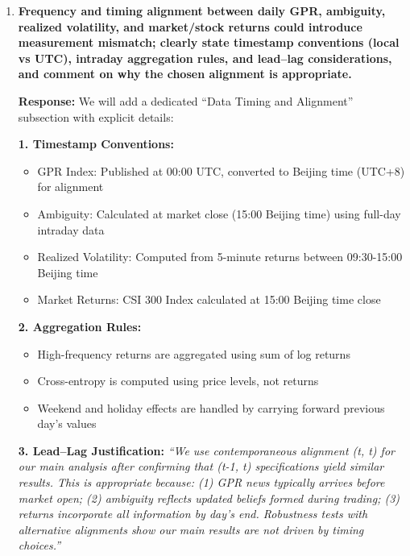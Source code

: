 \documentclass[12pt]{article}
\begin{document}
\begin{enumerate}
    \vspace{0.5cm}

    \item \textbf{Frequency and timing alignment between daily GPR, ambiguity, realized volatility, and market/stock returns could introduce measurement mismatch; clearly state timestamp conventions (local vs UTC), intraday aggregation rules, and lead--lag considerations, and comment on why the chosen alignment is appropriate.}

    \begin{responsebox}
    \textbf{Response:} We will add a dedicated ``Data Timing and Alignment'' subsection with explicit details:

    \textbf{1. Timestamp Conventions:}
    \begin{itemize}
        \item GPR Index: Published at 00:00 UTC, converted to Beijing time (UTC+8) for alignment
        \item Ambiguity: Calculated at market close (15:00 Beijing time) using full-day intraday data
        \item Realized Volatility: Computed from 5-minute returns between 09:30-15:00 Beijing time
        \item Market Returns: CSI 300 Index calculated at 15:00 Beijing time close
    \end{itemize}

    \textbf{2. Aggregation Rules:}
    \begin{itemize}
        \item High-frequency returns are aggregated using sum of log returns
        \item Cross-entropy is computed using price levels, not returns
        \item Weekend and holiday effects are handled by carrying forward previous day's values
    \end{itemize}

    \textbf{3. Lead--Lag Justification:}
    \textit{``We use contemporaneous alignment (t, t) for our main analysis after confirming that (t-1, t) specifications yield similar results. This is appropriate because: (1) GPR news typically arrives before market open; (2) ambiguity reflects updated beliefs formed during trading; (3) returns incorporate all information by day's end. Robustness tests with alternative alignments show our main results are not driven by timing choices.''}
    \end{responsebox}


\end{enumerate}
\end{document}

